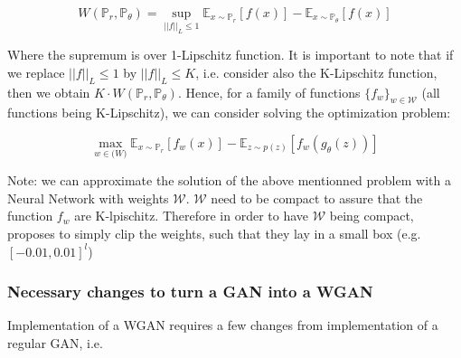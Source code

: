\documentclass{article}
\begin{document}
\begin{equation}
    W(\mathbb{P}_r, \mathbb{P}_{\theta}) = \sup_{||f||_L \leq 1} \mathbb{E}_{x \sim \mathbb{P}_r} [f(x)] - \mathbb{E}_{x \sim \mathbb{P}_{\theta}} [f(x)] 
\end{equation}

Where the supremum is over 1-Lipschitz function. It is important to note that if we replace $||f||_L \leq 1$ by $||f||_L \leq K$, i.e. consider also the K-Lipschitz function, then we obtain $K \cdot W(\mathbb{P}_r, \mathbb{P}_{\theta})$. Hence, for a family of functions $\{f_w\}_{w \in \mathcal{W}}$ (all functions being K-Lipschitz), we can consider solving the optimization problem:

\begin{equation}
    \max_{w \in \mathcal(W)}  \mathbb{E}_{x \sim \mathbb{P}_r}[f_w(x)] - \mathbb{E}_{z \sim p(z)}[f_w(g_{\theta}(z))]
\end{equation}

Note: we can approximate the solution of the above mentionned problem with a Neural Network with weights $\mathcal{W}$. $\mathcal{W}$ need to be compact to assure that the function $f_w$ are K-lpischitz. Therefore in order to have $\mathcal{W}$ being compact, \cite{arjovsky2017wasserstein} proposes to simply clip the weights, such that they lay in a small box (e.g. $[-0.01, 0.01]^l$)


\subsubsection{Necessary changes to turn a GAN into a WGAN}

Implementation of a WGAN requires a few changes from implementation of a regular GAN, i.e. 
\end{document}
